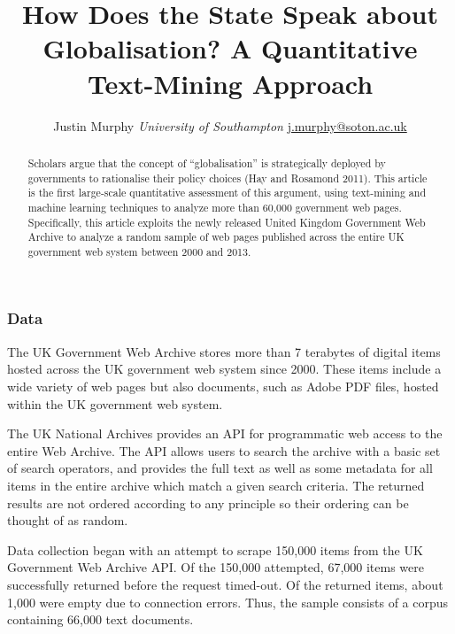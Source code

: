 \documentclass[11pt,article,oneside]{memoir}
\title{How Does the State Speak about Globalisation? A Quantitative Text-Mining
Approach}
\author{\Large Justin Murphy\vspace{0.05in} \newline\normalsize\emph{University of Southampton} \newline\footnotesize \url{j.murphy@soton.ac.uk}\vspace*{0.2in}\newline }
\date{}
\begin{document}
  
\setsansfont[Mapping=tex-text]{Gill Sans} 
\setmonofont[Mapping=tex-text,Scale=0.8]{Consolas}

\doublespacing


\maketitle



\vspace{-4ex}
\begin{abstract}

\noindent Scholars argue that the concept of ``globalisation'' is strategically
deployed by governments to rationalise their policy choices (Hay and
Rosamond 2011). This article is the first large-scale quantitative
assessment of this argument, using text-mining and machine learning
techniques to analyze more than 60,000 government web pages.
Specifically, this article exploits the newly released United Kingdom
Government Web Archive to analyze a random sample of web pages published
across the entire UK government web system between 2000 and 2013.

\end{abstract}

\newpage


\subsubsection{Data}\label{data}

The UK Government Web Archive stores more than 7 terabytes of digital
items hosted across the UK government web system since 2000. These items
include a wide variety of web pages but also documents, such as Adobe
PDF files, hosted within the UK government web system.

The UK National Archives provides an API for programmatic web access to
the entire Web Archive. The API allows users to search the archive with
a basic set of search operators, and provides the full text as well as
some metadata for all items in the entire archive which match a given
search criteria. The returned results are not ordered according to any
principle so their ordering can be thought of as random.

Data collection began with an attempt to scrape 150,000 items from the
UK Government Web Archive API. Of the 150,000 attempted, 67,000 items
were successfully returned before the request timed-out. Of the returned
items, about 1,000 were empty due to connection errors. Thus, the sample
consists of a corpus containing 66,000 text documents.
\end{document}
